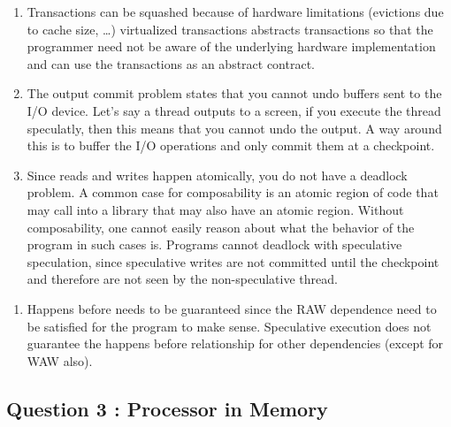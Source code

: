 \begin{enumerate}
\def\labelenumi{\arabic{enumi}.}
\item
  Transactions can be squashed because of hardware limitations
  (evictions due to cache size, \ldots{}) virtualized transactions
  abstracts transactions so that the programmer need not be aware of the
  underlying hardware implementation and can use the transactions as an
  abstract contract.
\item
  The output commit problem states that you cannot undo buffers sent to
  the I/O device. Let's say a thread outputs to a screen, if you execute
  the thread speculatly, then this means that you cannot undo the
  output. A way around this is to buffer the I/O operations and only
  commit them at a checkpoint.
\item
  Since reads and writes happen atomically, you do not have a deadlock
  problem. A common case for composability is an atomic region of code
  that may call into a library that may also have an atomic region.
  Without composability, one cannot easily reason about what the
  behavior of the program in such cases is. Programs cannot deadlock
  with speculative speculation, since speculative writes are not
  committed until the checkpoint and therefore are not seen by the
  non-speculative thread.
\end{enumerate}

\begin{enumerate}
\def\labelenumi{\alph{enumi}.}
\setcounter{enumi}{4}
\itemsep1pt\parskip0pt
\item
  Happens before needs to be guaranteed since the RAW dependence need to
  be satisfied for the program to make sense. Speculative execution does
  not guarantee the happens before relationship for other dependencies
  (except for WAW also).
\end{enumerate}

\subsection{Question 3 : Processor in
Memory}\label{question-3-processor-in-memory}


